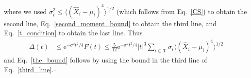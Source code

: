 \documentclass[aps,10pt,epsfig,graphics,mathbbm]{article}
\newcommand{\me}{\mathrm{e}}
\newcommand{\qed}{\hfill$\square$\par\vskip24pt}
\begin{document}
where we used $\sigma_i^2\le \langle (\hat{X}_i-\mu_i)^4\rangle^{1/2}$ (which follows from Eq.~\eqref{CS}) to obtain the second line, Eq.~\eqref{second_moment_bound} to obtain the third line, and Eq.~\eqref{t_condition} to obtain the last line. Thus
\begin{equation}
\begin{split}
\Delta(t)&\le \me^{-\sigma^2t^2/4}F(t)\le  \frac{5}{12}\me^{-\sigma^2t^2/4}|t|^3\sum_{i\in\mathcal{X}}\sigma_i\langle (\hat{X}_i-\mu_i)^4\rangle^{1/2}
\end{split}
\end{equation}
and Eq.~\eqref{the_bound} follows by using the bound in the third line of Eq.~\eqref{third_line}.\qed 


 
\end{document}
